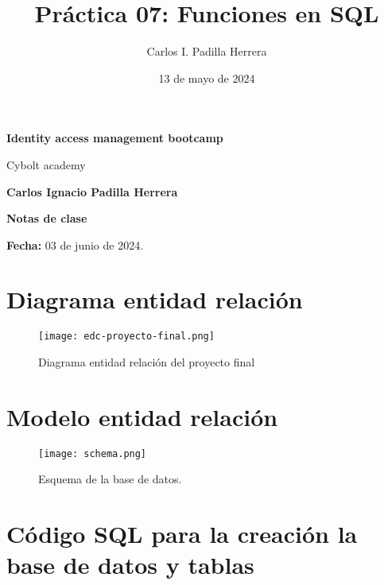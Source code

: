 \documentclass{article}
\title{Práctica 07: Funciones en SQL}
\author{Carlos I. Padilla Herrera}
\date{13 de mayo de 2024}
\begin{document}
\begin{titlepage}
    \centering
    \vspace*{1cm}
    \Huge\textbf{Identity access management bootcamp}
    
    \vspace{0.5cm}
    \LARGE Cybolt academy
    
    \vspace{1.5cm}
    \textbf{Carlos Ignacio Padilla Herrera}
    
    \vspace{0.5cm}
    \Large\textbf{Notas de clase}
    
    \vfill
    
    \Large\textbf{Fecha:} 03 de junio de 2024.
    
    \vspace{0.8cm}
\end{titlepage}

\newpage

\section*{Diagrama entidad relación}


\begin{figure}[ht]
    \centering
    {
        \texttt{[image: edc-proyecto-final.png]} %
    }
    \caption{Diagrama entidad relación del proyecto final}
\end{figure}

\newpage


\section*{Modelo entidad relación}


\begin{figure}[ht]
    \centering
    {
        \texttt{[image: schema.png]} %
    }
    \caption{Esquema de la base de datos.}
\end{figure}

\newpage

\section*{Código SQL para la creación la base de datos y tablas}
\end{document}
